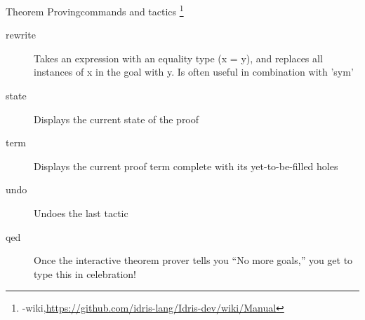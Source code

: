 \documentclass[rail]{beamer}
\begin{document}
\begin{frame}{Theorem Proving}{commands and tactics
    \footnote[frame,1]
    {\idris-wiki,\url{https://github.com/idris-lang/Idris-dev/wiki/Manual}}}
  \begin{description}
  \item[rewrite] Takes an expression with an equality type (x =
    y), and replaces all instances of x in the goal with y. Is often
    useful in combination with 'sym'
  \item[state] Displays the current state of the proof
  \item[term] Displays the current proof term complete with its
    yet-to-be-filled holes
  \item[undo] Undoes the last tactic
  \item[qed] Once the interactive theorem prover tells you ``No
    more goals,'' you get to type this in celebration!
  \end{description}
\end{frame}
\end{document}
